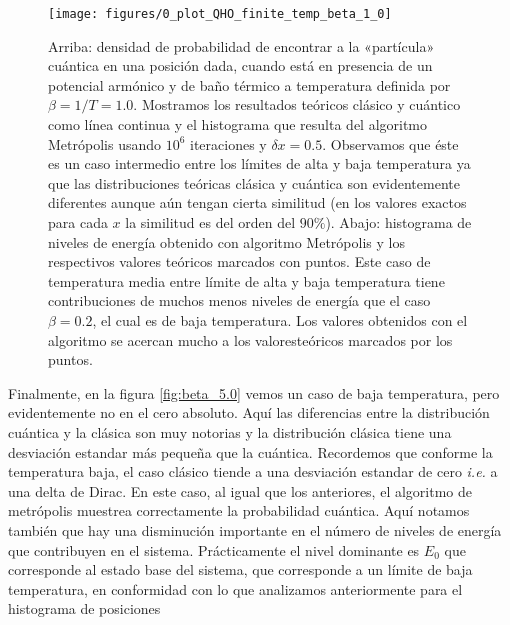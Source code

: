 \documentclass[%
 reprint,
 amsmath,amssymb,
 aps,
 pra,
]{revtex4-2}
\begin{document}
\begin{figure}[!b]
	\centering
	\texttt{[image: figures/0\_plot\_QHO\_finite\_temp\_beta\_1\_0]}
	\caption{Arriba: densidad de probabilidad de encontrar a la «partícula» cuántica en una posición dada, cuando está en presencia de un potencial armónico y de baño térmico a temperatura definida por $\beta=1/T=1.0$. Mostramos los resultados teóricos clásico y cuántico como línea continua y el histograma que resulta del algoritmo Metrópolis usando $10^6$ iteraciones y $\delta x = 0.5$. Observamos que éste es un caso intermedio entre los límites de alta y baja temperatura ya que las distribuciones teóricas clásica y cuántica son evidentemente diferentes aunque aún tengan cierta similitud (en los valores exactos para cada $x$ la similitud es del orden del $90\%$). Abajo: histograma de niveles de energía obtenido con algoritmo Metrópolis y los respectivos valores teóricos marcados con puntos. Este caso de temperatura media entre límite de alta y baja temperatura tiene contribuciones de muchos menos niveles de energía que el caso $\beta=0.2$, el cual es de baja temperatura. Los valores obtenidos con el algoritmo se acercan mucho a los valoresteóricos marcados por los puntos.}
	\label{fig:beta_1.0}
\end{figure}

Finalmente, en la figura \ref{fig:beta_5.0} vemos un caso de baja temperatura, pero evidentemente no en el cero absoluto. Aquí las diferencias entre la distribución cuántica y la clásica son muy notorias y la distribución clásica tiene una desviación estandar más pequeña que la cuántica. Recordemos que conforme la temperatura baja, el caso clásico tiende a una desviación estandar de cero \textit{i.e.} a una delta de Dirac. En este caso, al igual que los anteriores, el algoritmo de metrópolis muestrea correctamente la probabilidad cuántica. Aquí notamos también que hay una disminución importante en el número de niveles de energía que contribuyen en el sistema. Prácticamente el nivel dominante es $E_0$ que corresponde al estado base del sistema, que corresponde a un límite de baja temperatura, en conformidad con lo que analizamos anteriormente para el histograma de posiciones
\end{document}
